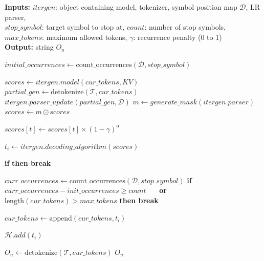 \begin{algorithm}
\small
\caption{\Tool{} Forward Function}
\label{alg:forward}
\begin{flushleft}
\textbf{Inputs:} $\textit{itergen}$: object containing model, tokenizer, symbol position map $\mathcal{D}$, LR parser, \\
$\textit{stop\_symbol}$: target symbol to stop at, $\textit{count}$: number of stop symbols, \\
$\textit{max\_tokens}$: maximum allowed tokens, $\gamma$: recurrence penalty (0 to 1) \\
\textbf{Output:} string $O_n$
\end{flushleft}

\begin{algorithmic}[1]
    
    
    \State $\textit{initial\_occurrences} \gets \text{count\_occurrences}(\mathcal{D}, \textit{stop\_symbol})$

        \State $\textit{scores} \gets \textit{itergen.model}(\textit{cur\_tokens}, KV)$
        \State $\textit{partial\_gen} \gets \text{detokenize}(\mathcal{T}, \textit{cur\_tokens})$
        \State $\textit{itergen.parser\_update}(\textit{partial\_gen}, \mathcal{D})$
        \State $m \gets \textit{generate\_mask}(\textit{itergen.parser})$
        \State $\textit{scores} \gets m \odot \textit{scores}$

            \State $\textit{scores}[t] \gets \textit{scores}[t] \times (1-\gamma)^\alpha$  
        \EndFor

        \State $\textit{t}_i \gets \textit{itergen.decoding\_algorithm}(\textit{scores})$

        \State \textbf{if }\textbf{ then break}

        
        \State $\textit{curr\_occurrences} \gets \text{count\_occurrences}(\mathcal{D}, \textit{stop\_symbol})$
        \State\textbf{if }{$\textit{curr\_occurrences} - \textit{init\_occurrences} \geq \textit{count}$ \State\ \ \ \textbf{or} $\text{length}(\textit{cur\_tokens}) > \textit{max\_tokens}$}\textbf{ then break}

        \State $\textit{cur\_tokens} \gets \text{append}(\textit{cur\_tokens}, \textit{t}_i)$
        
        \State $\mathcal{H}\textit{.add}(\textit{t}_i)$
    \EndWhile
    
    \State $O_n \gets \text{detokenize}(\mathcal{T}, \textit{cur\_tokens})$
    \State \Return $O_n$
\EndFunction
\end{algorithmic}
\end{algorithm}

